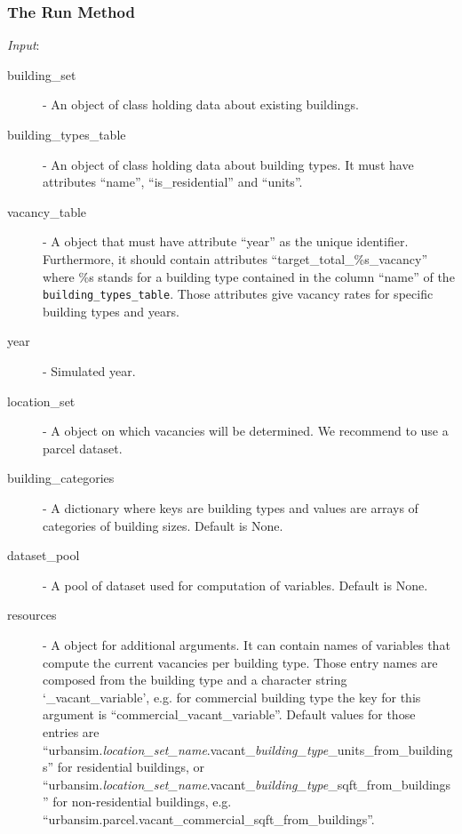 \subsubsection{The Run Method}
%
{\it Input}:
%
\begin{description}
\item[building_set] - An object of class  holding data about existing buildings.
\item[building_types_table] - An object of class  holding data about building types.
  It must have attributes ``name'', ``is_residential'' and ``units''.
\item[vacancy_table] - A  object that must have attribute 
  ``year'' as the unique identifier. Furthermore, it should contain attributes 
  ``target_total_\%s_vacancy'' where \%s stands for a building type contained
  in the column ``name'' of the \verb|building_types_table|.
  Those attributes give vacancy rates for specific building types and years.
\item[year] - Simulated year.
\item[location_set] - A  object on which vacancies will be
  determined. We recommend to use a parcel dataset.
\item[building_categories] - A dictionary where keys are building types 
and values are arrays of categories of building sizes. Default is None.
\item[dataset_pool] - A pool of dataset used for computation of variables. Default is None.
\item[resources] - A  object for additional arguments. It can
  contain names of variables that compute the current vacancies per building
  type. Those entry names are composed from the building type and a character
  string `_vacant_variable', e.g. for commercial building type the key for this
  argument is ``commercial_vacant_variable''.  Default values for those
  entries are ``urbansim.{\it location_set_name}.vacant_{\it building_type}_units_from_buildings'' for residential buildings, 
  or ``urbansim.{\it location_set_name}.vacant_{\it building_type}_sqft_from_buildings'' for non-residential buildings, e.g.
  ``urbansim.parcel.vacant_commercial_sqft_from_buildings''.
\end{description}

